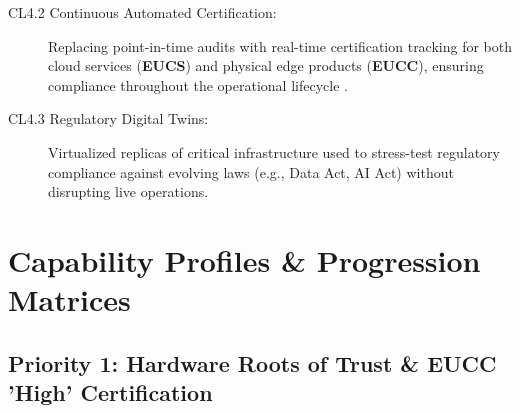 \documentclass[12pt,a4paper]{article}
\begin{document}
\begin{description}
\item[CL4.2 Continuous Automated Certification:] Replacing point-in-time audits with real-time certification tracking for both cloud services (\textbf{EUCS}) and physical edge products (\textbf{EUCC}), ensuring compliance throughout the operational lifecycle \cite{eucc}.

\item[CL4.3 Regulatory Digital Twins:] Virtualized replicas of critical infrastructure used to stress-test regulatory compliance against evolving laws (e.g., Data Act, AI Act) without disrupting live operations.

\end{description}

\newpage
\section{Capability Profiles \& Progression Matrices}

\subsection*{Priority 1: Hardware Roots of Trust \& EUCC 'High' Certification}
\end{document}
